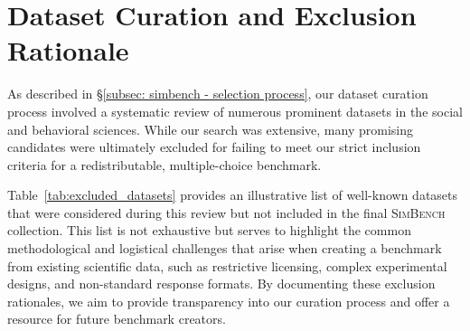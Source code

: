 \documentclass{article} %
\begin{document}
\section{Dataset Curation and Exclusion Rationale}
\label{app:excluded_datasets}

As described in \S\ref{subsec: simbench - selection process}, our dataset curation process involved a systematic review of numerous prominent datasets in the social and behavioral sciences. While our search was extensive, many promising candidates were ultimately excluded for failing to meet our strict inclusion criteria for a redistributable, multiple-choice benchmark.

Table~\ref{tab:excluded_datasets} provides an illustrative list of well-known datasets that were considered during this review but not included in the final \textsc{SimBench} collection. This list is not exhaustive but serves to highlight the common methodological and logistical challenges that arise when creating a benchmark from existing scientific data, such as restrictive licensing, complex experimental designs, and non-standard response formats. By documenting these exclusion rationales, we aim to provide transparency into our curation process and offer a resource for future benchmark creators.
\end{document}
